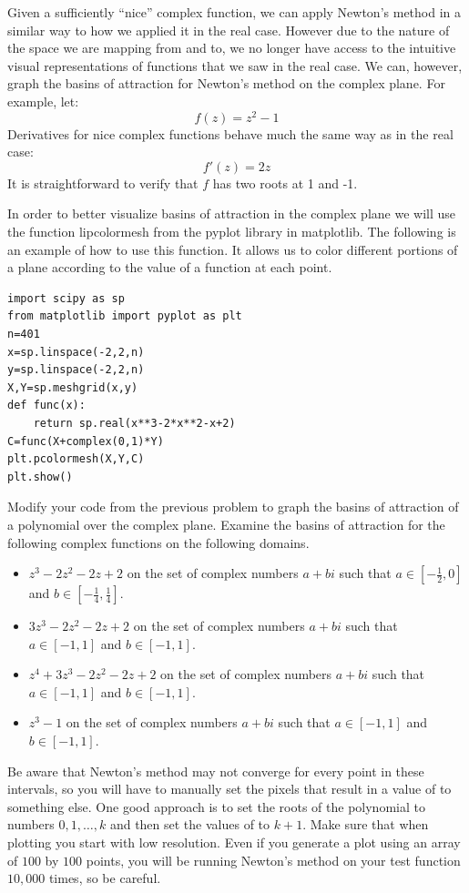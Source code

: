 Given a sufficiently ``nice'' complex function, we can apply Newton's method in a similar way to how we applied it in the real case.
However due to the nature of the space we are mapping from and to, we no longer have access to the intuitive visual representations of functions that we saw in the real case.
We can, however, graph the basins of attraction for Newton's method on the complex plane.
For example, let:
\[
f(z) = z^2 - 1
\]
Derivatives for nice complex functions behave much the same way as in the real case:
\[
f'(z) = 2z
\]
It is straightforward to verify that $f$ has two roots at 1 and -1.

In order to better visualize basins of attraction in the complex plane we will use the function li{pcolormesh} from the pyplot library in matplotlib.
The following is an example of how to use this function.
It allows us to color different portions of a plane according to the value of a function at each point.

\begin{lstlisting}
import scipy as sp
from matplotlib import pyplot as plt
n=401
x=sp.linspace(-2,2,n)
y=sp.linspace(-2,2,n)
X,Y=sp.meshgrid(x,y)
def func(x):
    return sp.real(x**3-2*x**2-x+2)
C=func(X+complex(0,1)*Y)
plt.pcolormesh(X,Y,C)
plt.show()
\end{lstlisting}

\begin{problem}
Modify your code from the previous problem to graph the basins of attraction of a polynomial over the complex plane.
Examine the basins of attraction for the following complex functions on the following domains.
\begin{itemize}

\item $z^3 - 2 z^2 - 2 z + 2$ on the set of complex numbers $a + b i$ such that $a \in \left[-\frac{1}{2}, 0\right]$ and $b \in \left[-\frac{1}{4}, \frac{1}{4}\right]$.

\item $3 z^3 - 2 z^2 - 2 z + 2$ on the set of complex numbers $a + b i$ such that $a \in \left[-1, 1\right]$ and $b \in \left[-1, 1\right]$.

\item $z^4 + 3 z^3 - 2 z^2 - 2 z + 2$ on the set of complex numbers $a + b i$ such that $a \in \left[-1, 1\right]$ and $b \in \left[-1, 1\right]$.

\item $z^3 - 1$ on the set of complex numbers $a + b i$ such that $a \in \left[-1, 1\right]$ and $b \in \left[-1, 1\right]$.

\end{itemize}
Be aware that Newton's method may not converge for every point in these intervals, so you will have to manually set the pixels that result in a value of  to something else.
One good approach is to set the roots of the polynomial to numbers $0, 1, \dots, k$ and then set the values of  to $k+1$.
Make sure that when plotting you start with low resolution.
Even if you generate a plot using an array of $100$ by $100$ points, you will be running Newton's method on your test function $10,000$ times, so be careful.  
\end{problem}

